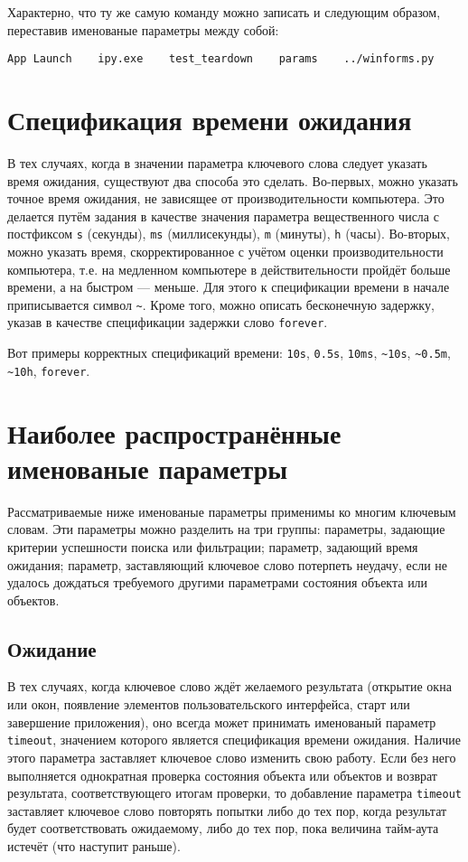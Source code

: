 \documentclass[11pt]{book} %
\begin{document}
Характерно, что ту же самую команду можно записать и следующим образом, переставив именованые параметры между собой:

\begin{verbatim}
App Launch    ipy.exe    test_teardown    params    ../winforms.py
\end{verbatim}


\section{Спецификация времени ожидания}

В тех случаях, когда в значении параметра ключевого слова следует указать время ожидания, существуют два способа это сделать. Во-первых, можно указать точное время ожидания, не зависящее от производительности компьютера. Это делается путём задания в качестве значения параметра вещественного числа с постфиксом \verb"s" (секунды), \verb"ms" (миллисекунды), \verb"m" (минуты), \verb"h" (часы). Во-вторых, можно указать время, скорректированное с учётом оценки производительности компьютера, т.е. на медленном компьютере в действительности пройдёт больше времени, а на быстром --- меньше. Для этого к спецификации времени в начале приписывается символ \verb"~". Кроме того, можно описать бесконечную задержку, указав в качестве спецификации задержки слово \verb"forever".

Вот примеры корректных спецификаций времени: \verb"10s", \verb"0.5s", \verb"10ms", \verb"~10s", \verb"~0.5m", \verb"~10h",  \verb"forever".

\section{Наиболее распространённые именованые параметры}
Рассматриваемые ниже именованые параметры применимы ко многим ключевым словам. Эти параметры можно разделить на три группы: параметры, задающие критерии успешности поиска или фильтрации; параметр, задающий время ожидания; параметр, заставляющий ключевое слово потерпеть неудачу, если не удалось дождаться требуемого другими параметрами состояния объекта или объектов.

\subsection{Ожидание}

В тех случаях, когда ключевое слово ждёт желаемого результата (открытие окна или окон, появление элементов пользовательского интерфейса, старт или завершение приложения), оно всегда может принимать именованый параметр \verb|timeout|, значением которого является спецификация времени ожидания. Наличие этого параметра заставляет ключевое слово изменить свою работу. Если без него выполняется однократная проверка состояния объекта или объектов и возврат результата, соответствующего итогам проверки, то добавление параметра \verb|timeout| заставляет ключевое слово повторять попытки либо до тех пор, когда результат будет соответствовать ожидаемому, либо до тех пор, пока величина тайм-аута истечёт (что наступит раньше).
\end{document}
